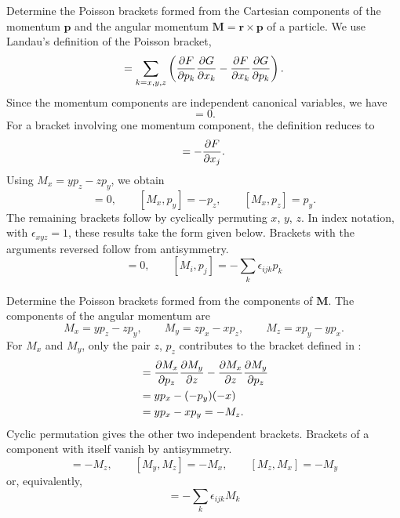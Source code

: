 
\begin{problem}[title={Poisson brackets: momentum, angular momentum}]
{
Determine the Poisson brackets formed from the Cartesian components of the momentum $\mathbf{p}$ and the angular momentum $\mathbf{M} = \mathbf{r} \times \mathbf{p}$ of a particle.
}
{
We use Landau's definition of the Poisson bracket,
\begin{equation*}
    [F, G] = \sum_{k = x, y, z}\left(\pd{F}{p_k}\pd{G}{x_k} - \pd{F}{x_k}\pd{G}{p_k}\right).
\end{equation*}
Since the momentum components are independent canonical variables, we have
\begin{equation*}
    [p_i, p_j] = 0.
\end{equation*}
For a bracket involving one momentum component, the definition reduces to
\begin{equation*}
    [F, p_j] = -\pd{F}{x_j}.
\end{equation*}
Using $M_x = yp_z - zp_y$, we obtain
\begin{equation*}
    [M_x, p_x] = 0, \qquad [M_x, p_y] = -p_z, \qquad [M_x, p_z] = p_y.
\end{equation*}
The remaining brackets follow by cyclically permuting $x$, $y$, $z$. In index notation, with $\epsilon_{xyz} = 1$, these results take the form given below. Brackets with the arguments reversed follow from antisymmetry.
}
{
\begin{equation*}
    [p_i, p_j] = 0, \qquad [M_i, p_j] = -\sum_k\epsilon_{ijk}p_k
\end{equation*}
}
\end{problem}


\begin{problem}[title={Poisson brackets of angular momentum}]
{
Determine the Poisson brackets formed from the components of $\mathbf{M}$.
}
{
The components of the angular momentum are
\begin{equation*}
    M_x = yp_z - zp_y, \qquad M_y = zp_x - xp_z, \qquad M_z = xp_y - yp_x.
\end{equation*}
For $M_x$ and $M_y$, only the pair $z$, $p_z$ contributes to the bracket defined in :
\begin{align*}
    [M_x, M_y] &= \pd{M_x}{p_z}\pd{M_y}{z} - \pd{M_x}{z}\pd{M_y}{p_z} \\
    &= yp_x - (-p_y)(-x) \\
    &= yp_x - xp_y = -M_z.
\end{align*}
Cyclic permutation gives the other two independent brackets. Brackets of a component with itself vanish by antisymmetry.
}
{
\begin{equation*}
    [M_x, M_y] = -M_z, \qquad [M_y, M_z] = -M_x, \qquad [M_z, M_x] = -M_y
\end{equation*}
or, equivalently,
\begin{equation*}
    [M_i, M_j] = -\sum_k\epsilon_{ijk}M_k
\end{equation*}
}
\end{problem}

